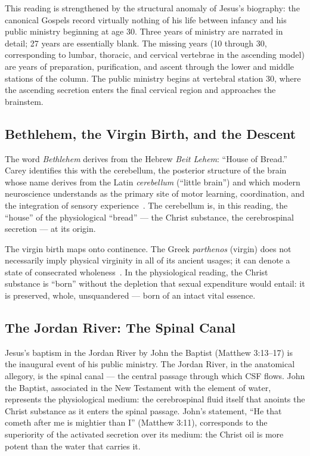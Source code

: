 \documentclass[12pt, a4paper]{article}
\begin{document}
This reading is strengthened by the structural anomaly of Jesus's biography:
the canonical Gospels record virtually nothing of his life between infancy and
his public ministry beginning at age 30. Three years of ministry are narrated
in detail; 27 years are essentially blank. The missing years (10 through 30,
corresponding to lumbar, thoracic, and cervical vertebrae in the ascending
model) are years of preparation, purification, and ascent through the lower
and middle stations of the column. The public ministry begins at vertebral
station 30, where the ascending secretion enters the final cervical region
and approaches the brainstem.

\subsection{Bethlehem, the Virgin Birth, and the Descent}

The word \emph{Bethlehem} derives from the Hebrew \emph{Beit Lehem}: ``House
of Bread.'' Carey identifies this with the cerebellum, the posterior structure
of the brain whose name derives from the Latin \emph{cerebellum} (``little
brain'') and which modern neuroscience understands as the primary site of
motor learning, coordination, and the integration of sensory
experience~\autocite[889]{gray2016}. The cerebellum is, in this reading, the
``house'' of the physiological ``bread'' — the Christ substance, the
cerebrospinal secretion — at its origin.

The virgin birth maps onto continence. The Greek \emph{parthenos} (virgin)
does not necessarily imply physical virginity in all of its ancient usages;
it can denote a state of consecrated wholeness~\autocite[117]{steiner1902}.
In the physiological reading, the Christ substance is ``born'' without the
depletion that sexual expenditure would entail: it is preserved, whole,
unsquandered — born of an intact vital essence.

\subsection{The Jordan River: The Spinal Canal}

Jesus's baptism in the Jordan River by John the Baptist (Matthew 3:13--17) is
the inaugural event of his public ministry. The Jordan River, in the
anatomical allegory, is the spinal canal — the central passage through which
CSF flows. John the Baptist, associated in the New Testament with the element
of water, represents the physiological medium: the cerebrospinal fluid itself
that anoints the Christ substance as it enters the spinal passage. John's
statement, ``He that cometh after me is mightier than I'' (Matthew 3:11),
corresponds to the superiority of the activated secretion over its medium:
the Christ oil is more potent than the water that carries it.
\end{document}
